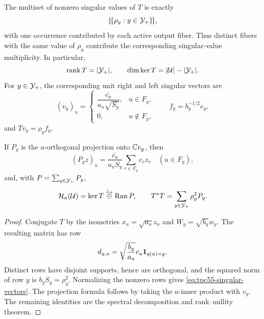 \begin{theorem}
\label{thm:tpc55-complete-svd}
The multiset of nonzero singular values of \(T\) is exactly
\begin{equation}
 \{\!\{\rho_y:y\in\mathcal Y_+\}\!\},
\label{eq:tpc55-all-singular-values}
\end{equation}
with one occurrence contributed by each active output fiber.  Thus distinct
fibers with the same value of \(\rho_y\) contribute the corresponding
singular-value multiplicity.  In particular,
\begin{equation}
 \operatorname{rank} T=|\mathcal Y_+|,
 \qquad
 \dim\ker T=|\mathcal U|-|\mathcal Y_+|.
 \label{eq:tpc55-rank-nullity}
\end{equation}
For \(y\in\mathcal Y_+\), the corresponding unit right and left singular
vectors are
\begin{equation}
 (v_y)_u=
 \begin{cases}
 \dfrac{\overline{c_u}}{a_u\sqrt{S_y}},&u\in F_y,\\[6pt]
 0,&u\notin F_y,
 \end{cases}
 \qquad
 f_y=b_y^{-1/2}e_y,
 \label{eq:tpc55-singular-vectors}
\end{equation}
and \(Tv_y=\rho_yf_y\).

If \(P_y\) is the \(a\)-orthogonal projection onto \(\mathbb C v_y\), then
\begin{equation}
 (P_yz)_u
 =\frac{\overline{c_u}}{a_uS_y}
   \sum_{v\in F_y}c_vz_v
 \quad(u\in F_y),
 \label{eq:tpc55-visible-projection}
\end{equation}
and, with \(P=\sum_{y\in\mathcal Y_+}P_y\),
\begin{equation}
 \mathcal H_a(\mathcal U)
 =\ker T\mathbin{\mathop{\oplus}\limits^{\perp_a}}
  \operatorname{Ran}P,
 \qquad
 T^*T=\sum_{y\in\mathcal Y_+}\rho_y^2P_y.
 \label{eq:tpc55-svd-decomposition}
\end{equation}
\end{theorem}

\begin{proof}
Conjugate \(T\) by the isometries
\(x_u=\sqrt{a_u}z_u\) and \(W_y=\sqrt{b_y}w_y\).  The resulting matrix
has row
\[
 d_{y,u}=\sqrt{\frac{b_y}{a_u}}c_u\mathbf 1_{q(u)=y}.
\]
Distinct rows have disjoint supports, hence are orthogonal, and the squared
norm of row \(y\) is \(b_yS_y=\rho_y^2\).  Normalizing the nonzero rows
gives \eqref{eq:tpc55-singular-vectors}.  The projection formula follows
by taking the \(a\)-inner product with \(v_y\).  The remaining identities
are the spectral decomposition and rank--nullity theorem.
\end{proof}

